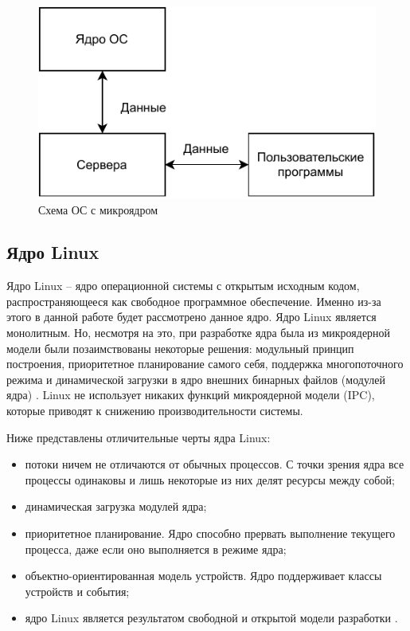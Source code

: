 \begin{figure}[h]
	\centering
	\includegraphics[width=\textwidth]{img/micro_kernel.pdf}
	\caption{Схема ОС с микроядром}
	\label{fig:micro_kernel}
\end{figure}

\subsection{Ядро Linux}

Ядро Linux \cite{linux} -- ядро операционной системы с открытым исходным кодом, распространяющееся как свободное программное обеспечение. Именно из-за этого в данной работе будет рассмотрено данное ядро. Ядро Linux является монолитным. Но, несмотря на это, при разработке ядра была из микроядерной модели были позаимствованы некоторые решения: модульный принцип построения, приоритетное планирование самого себя, поддержка многопоточного режима и динамической загрузки в ядро внешних бинарных файлов (модулей ядра) \cite{kernel-development}. Linux не использует никаких функций микроядерной модели (IPC), которые приводят к снижению производительности системы.

Ниже представлены отличительные черты ядра Linux:

\begin{itemize}
	\item потоки ничем не отличаются от обычных процессов. С точки зрения ядра все процессы одинаковы и лишь некоторые из них делят ресурсы между собой;
	\item динамическая загрузка модулей ядра;
	\item приоритетное планирование. Ядро способно прервать выполнение текущего процесса, даже если оно выполняется в режиме ядра;
	\item объектно-ориентированная модель устройств. Ядро поддерживает классы устройств и события;
	\item ядро Linux является результатом свободной и открытой модели разработки \cite{kernel-development}.
\end{itemize}

